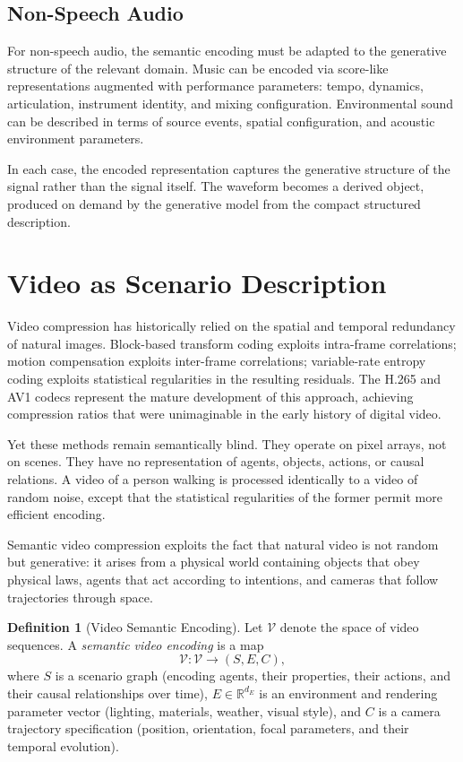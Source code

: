 \documentclass[12pt,a4paper]{article}
\theoremstyle{definition}
\newtheorem{definition}[theorem]{Definition}
\theoremstyle{remark}
\begin{document}
\subsection{Non-Speech Audio}

For non-speech audio, the semantic encoding must be adapted to the generative structure of the relevant domain. Music can be encoded via score-like representations augmented with performance parameters: tempo, dynamics, articulation, instrument identity, and mixing configuration. Environmental sound can be described in terms of source events, spatial configuration, and acoustic environment parameters.

In each case, the encoded representation captures the generative structure of the signal rather than the signal itself. The waveform becomes a derived object, produced on demand by the generative model from the compact structured description.

\section{Video as Scenario Description}
\label{sec:video}

Video compression has historically relied on the spatial and temporal redundancy of natural images. Block-based transform coding exploits intra-frame correlations; motion compensation exploits inter-frame correlations; variable-rate entropy coding exploits statistical regularities in the resulting residuals. The H.265 and AV1 codecs represent the mature development of this approach, achieving compression ratios that were unimaginable in the early history of digital video.

Yet these methods remain semantically blind. They operate on pixel arrays, not on scenes. They have no representation of agents, objects, actions, or causal relations. A video of a person walking is processed identically to a video of random noise, except that the statistical regularities of the former permit more efficient encoding.

Semantic video compression exploits the fact that natural video is not random but generative: it arises from a physical world containing objects that obey physical laws, agents that act according to intentions, and cameras that follow trajectories through space.

\begin{definition}[Video Semantic Encoding]
Let $\mathcal{V}$ denote the space of video sequences. A \emph{semantic video encoding} is a map
\[
\mathcal{V} : \mathcal{V} \rightarrow (S, E, C),
\]
where $S$ is a scenario graph (encoding agents, their properties, their actions, and their causal relationships over time), $E \in \mathbb{R}^{d_E}$ is an environment and rendering parameter vector (lighting, materials, weather, visual style), and $C$ is a camera trajectory specification (position, orientation, focal parameters, and their temporal evolution).
\end{definition}
\end{document}
